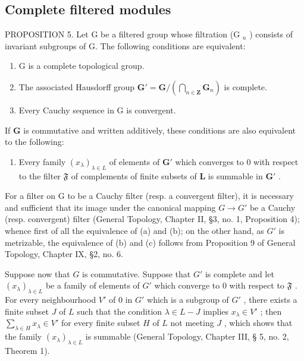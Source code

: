 \subsection{Complete filtered modules}

PROPOSITION 5. Let G be a filtered group whose filtration (G \(_{n}\) ) consists of invariant subgroups of G. The following conditions are equivalent:

\begin{enumerate}
\def\labelenumi{(\alph{enumi})}
\item
  G is a complete topological group.
\item
  The associated Hausdorff group \(\mathbf{G}' = \mathbf{G} / \left(\bigcap_{n\in \mathbf{Z}}\mathbf{G}_n\right)\) is complete.
\item
  Every Cauchy sequence in G is convergent.
\end{enumerate}

If \(\mathbf{G}\) is commutative and written additively, these conditions are also equivalent to the following:

\begin{enumerate}
\def\labelenumi{(\alph{enumi})}
\setcounter{enumi}{3}
\tightlist
\item
  Every family \((x_{\lambda})_{\lambda \in L}\) of elements of \(\mathbf{G}'\) which converges to 0 with respect to the filter \(\mathfrak{F}\) of complements of finite subsets of \(\mathbf{L}\) is summable in \(\mathbf{G}'\) .
\end{enumerate}

For a filter on G to be a Cauchy filter (resp. a convergent filter), it is necessary and sufficient that its image under the canonical mapping \(G \rightarrow G'\) be a Cauchy (resp. convergent) filter (General Topology, Chapter II, §3, no. 1, Proposition 4); whence first of all the equivalence of (a) and (b); on the other hand, as \(G'\) is metrizable, the equivalence of (b) and (c) follows from Proposition 9 of General Topology, Chapter IX, §2, no. 6.

Suppose now that \(G\) is commutative. Suppose that \(G'\) is complete and let \((x_{\lambda})_{\lambda \in L}\) be a family of elements of \(G'\) which converge to 0 with respect to \(\mathfrak{F}\) . For every neighbourhood \(V'\) of 0 in \(G'\) which is a subgroup of \(G'\) , there exists a finite subset \(J\) of \(L\) such that the condition \(\lambda \in L - J\) implies \(x_{\lambda} \in V'\) ; then \(\sum_{\lambda \in H} x_{\lambda} \in V'\) for every finite subset \(H\) of \(L\) not meeting \(J\) , which shows that the family \((x_{\lambda})_{\lambda \in L}\) is summable (General Topology, Chapter III, § 5, no. 2, Theorem 1).

